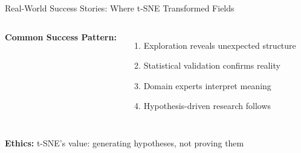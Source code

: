 \documentclass[aspectratio=169]{beamer}
\newcommand{\ethics}[1]{\colorbox{purple!10}{\textcolor{ethicscolor}{\textbf{Ethics:} #1}}}
\begin{document}
\begin{frame}{Real-World Success Stories: Where t-SNE Transformed Fields}
\begin{columns}

\vspace{0.3cm}
\textbf{Common Success Pattern:}
\begin{enumerate}
\item Exploration reveals unexpected structure
\item Statistical validation confirms reality
\item Domain experts interpret meaning
\item Hypothesis-driven research follows
\end{enumerate}
\end{columns}

\vspace{0.3cm}
\ethics{t-SNE's value: generating hypotheses, not proving them}
\end{frame}
\end{document}
